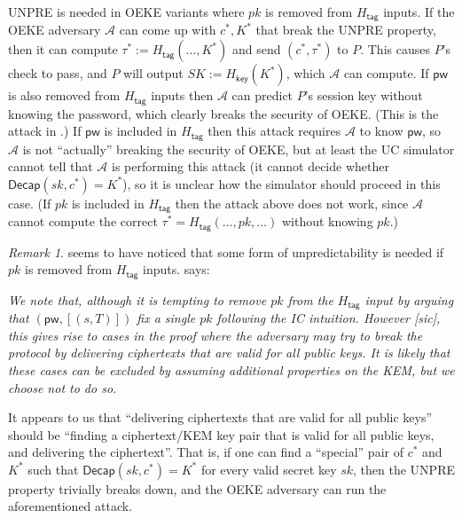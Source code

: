 \documentclass{article}
\theoremstyle{plain}
\theoremstyle{definition}
\theoremstyle{remark}
\newtheorem{remark}{Remark}
\newcommand{\adv}{\mathcal{A}}
\newcommand{\Decap}{\mathsf{Decap}}
\newcommand{\Hkey}{H_\mathsf{key}}
\newcommand{\Htag}{H_\mathsf{tag}}
\newcommand{\pw}{\mathsf{pw}}
\begin{document}
UNPRE is needed in OEKE variants where $pk$ is removed from $\Htag$ inputs. If the OEKE adversary $\adv$ can come up with $c^*,K^*$ that break the UNPRE property, then it can compute $\tau^* := \Htag(\dots, K^*)$ and send $(c^*,\tau^*)$ to $P$. This causes $P$'s check to pass, and $P$ will output $SK := \Hkey(K^*)$, which $\adv$ can compute. If $\pw$ is also removed from $\Htag$ inputs then $\adv$ can predict $P$'s session key without knowing the password, which clearly breaks the security of OEKE. (This is the attack in .) If $\pw$ is included in $\Htag$ then this attack requires $\adv$ to know $\pw$, so $\adv$ is not ``actually'' breaking the security of OEKE, but at least the UC simulator cannot tell that $\adv$ is performing this attack (it cannot decide whether $\Decap(sk,c^*) = K^*$), so it is unclear how the simulator should proceed in this case. (If $pk$ is included in $\Htag$ then the attack above does not work, since $\adv$ cannot compute the correct $\tau^* = \Htag(\dots, pk, \dots)$ without knowing $pk$.)
\begin{remark}
\cite{EPRINT:ArrBarJar25} seems to have noticed that some form of unpredictability is needed if $pk$ is removed from $\Htag$ inputs. \cite[Section~5]{EPRINT:ArrBarJar25} says:
\begin{displayquote}
  \emph{We note that, although it is tempting to remove $pk$ from the $\Htag$ input by arguing that $(\pw,[(s,T)])$ fix a single $pk$ following the IC intuition. However [sic], this gives rise to cases in the proof where the adversary may try to break the protocol by delivering ciphertexts that are valid for all public keys. It is likely that these cases can be excluded by assuming additional properties on the KEM, but we choose not to do so.}
\end{displayquote}
It appears to us that ``delivering ciphertexts that are valid for all public keys'' should be ``finding a ciphertext/KEM key pair that is valid for all public keys, and delivering the ciphertext''. That is, if one can find a ``special'' pair of $c^*$ and $K^*$ such that $\Decap(sk,c^*) = K^*$ for every valid secret key $sk$, then the UNPRE property trivially breaks down, and the OEKE adversary can run the aforementioned attack.
\end{remark}
\end{document}
